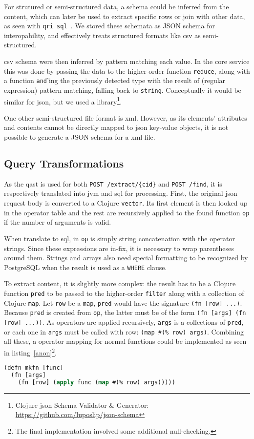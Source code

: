 For strutured or semi-structured data, a schema could be inferred from
the content, which can later be used to extract specific rows or join
with other data, as seen with \verb|qri sql|~\cite{qricli}.  We stored
these schemata as JSON schema for interopability, and effectively treats
structured formats like \gls{csv} as semi-structured.

\gls{csv} schema were then inferred by pattern matching each value.
In the core service this was done by passing the data to the higher-order
function \verb|reduce|, along with a function \verb|and|'ing the previously
detected type with the result of (regular expression) pattern matching,
falling back to \verb|string|.  Conceptually it would be similar for \gls{json},
but we used a library\footnote{Clojure \gls{json} Schema Validator \& Generator:
\url{https://github.com/luposlip/json-schema}}.

One other semi-structured file format is \gls{xml}.  However, as its elements'
attributes and contents cannot be directly mapped to \gls{json} key-value
objects, it is not possible to generate a JSON schema for a \gls{xml} file.

\subsection{Query Transformations}
As the \gls{qast} is used for both \verb|POST /extract/{cid}|
and \verb|POST /find|, it is respectively translated into \gls{jvm}
and \gls{sql} for processing.  First, the original \gls{json} request body
is converted to a Clojure \verb|vector|.  Its first element is then looked up
in the operator table and the rest are recursively applied to the found function
\verb|op| if the number of arguments is valid.

When translate to \gls{sql}, in \verb|op| is simply string concatenation
with the operator strings.  Since these expressions are in-fix, it is necessary
to wrap parentheses around them.  Strings and arrays also need special
formatting to be recognized by PostgreSQL when the result is used
as a \verb|WHERE| clause.

To extract content, it is slightly more complex: the result has to be
a Clojure function \verb|pred| to be passed to the higher-order \verb|filter|
along with a collection of Clojure \verb|map|.  Let \verb|row| be
a \verb|map|, \verb|pred| would have the signature \verb|(fn [row] ...)|.
Because \verb|pred| is created from \verb|op|, the latter must be of the form
\verb|(fn [args] (fn [row] ...))|.  As operators are applied recursively,
\verb|args| is a collections of \verb|pred|, or each one in \verb|args|
must be called with row: \verb|(map #(% row) args)|.  Combining all these,
a operator mapping for normal functions could be implemented as seen in
listing~\ref{anon}\footnote{The final implementation involved some additional
null-checking.}.
\begin{lstlisting}[label=anon,caption=Constructing a function returning
  another one lazily applying given the given one,language=lisp]
(defn mkfn [func]
  (fn [args]
    (fn [row] (apply func (map #(% row) args)))))
\end{lstlisting}

